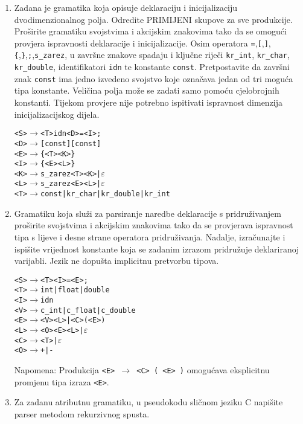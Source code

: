 \documentclass[times, 12pt, utf8]{book}
\begin{document}
\begin{enumerate}[resume]
\item
Zadana je gramatika koja opisuje deklaraciju i inicijalizaciju dvodimenzionalnog polja.
Odredite PRIMIJENI skupove za sve produkcije.
Proširite gramatiku svojstvima i akcijskim znakovima tako da se omogući provjera ispravnosti deklaracije i inicijalizacije.
Osim operatora \texttt{=},\texttt{[},\texttt{]},\verb|{|,\verb|}|,\texttt{;},\texttt{s\_zarez}, u završne znakove spadaju i ključne riječi \texttt{kr\_int}, \texttt{kr\_char}, \texttt{kr\_double}, identifikatori \texttt{idn} te konstante \texttt{const}.
Pretpostavite da završni znak \texttt{const} ima jedno izvedeno svojstvo koje označava jedan od tri moguća tipa konstante.
Veličina polja može se zadati samo pomoću cjelobrojnih konstanti.
Tijekom provjere nije potrebno ispitivati ispravnost dimenzija inicijalizacijskog dijela. \cite[str.~178-180]{udzbenik}

\begin{alltt}
<S> \(\to\) <T> idn <D> = <I> ;
<D> \(\to\) [ const ][ const ]
<E> \(\to\) \verb|{| <T> <K> \verb|}|
<I> \(\to\) \verb|{| <E> <L> \verb|}|
<K> \(\to\) s_zarez <T> <K> | \(\varepsilon\)
<L> \(\to\) s_zarez <E> <L> | \(\varepsilon\)
<T> \(\to\) const | kr_char | kr_double | kr_int
\end{alltt} 

\item
Gramatiku koja služi za parsiranje naredbe deklaracije s pridruživanjem proširite svojstvima i akcijskim znakovima tako da se provjerava ispravnost tipa s lijeve i desne strane operatora pridruživanja.
Nadalje, izračunajte i ispišite vrijednost konstante koja se zadanim izrazom pridružuje deklariranoj varijabli.
Jezik ne dopušta implicitnu pretvorbu tipova. \cite[str.~178-180]{udzbenik} \cite{auditorne}

\begin{alltt}
<S>	\(\to\) <T> <I> = <E> ;
<T>	\(\to\) int | float | double
<I>	\(\to\) idn
<V>	\(\to\) c\_int | c\_float | c\_double
<E>	\(\to\) <V> <L> | <C> ( <E> )
<L>	\(\to\) <O> <E> <L> | \(\varepsilon\)
<C>	\(\to\) <T> | \(\varepsilon\)
<O>	\(\to\) + | -
\end{alltt}

Napomena: Produkcija \texttt{<E> \(\to\) <C> ( <E> )} omogućava eksplicitnu promjenu tipa izraza \texttt{<E>}. 

\item
Za zadanu atributnu gramatiku, u pseudokodu sličnom jeziku C napišite parser metodom rekurzivnog spusta. \cite[str.~195-198]{udzbenik}


\end{enumerate}
\end{document}

